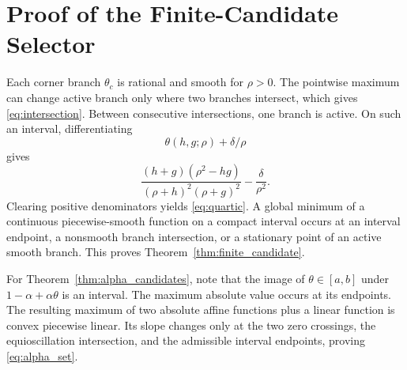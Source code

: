 \documentclass[11pt]{article}
\theoremstyle{definition}
\begin{document}
\section{Proof of the Finite-Candidate Selector}\label{app:candidates}
Each corner branch $\theta_c$ is rational and smooth for $\rho>0$. The pointwise maximum can change active branch only where two branches intersect, which gives \eqref{eq:intersection}. Between consecutive intersections, one branch is active. On such an interval, differentiating
\[
\theta(h,g;\rho)+\delta/\rho
\]
gives
\[
\frac{(h+g)(\rho^2-hg)}{(\rho+h)^2(\rho+g)^2}-\frac{\delta}{\rho^2}.
\]
Clearing positive denominators yields \eqref{eq:quartic}. A global minimum of a continuous piecewise-smooth function on a compact interval occurs at an interval endpoint, a nonsmooth branch intersection, or a stationary point of an active smooth branch. This proves Theorem~\ref{thm:finite_candidate}.

For Theorem~\ref{thm:alpha_candidates}, note that the image of $\theta\in[a,b]$ under $1-\alpha+\alpha\theta$ is an interval. The maximum absolute value occurs at its endpoints. The resulting maximum of two absolute affine functions plus a linear function is convex piecewise linear. Its slope changes only at the two zero crossings, the equioscillation intersection, and the admissible interval endpoints, proving \eqref{eq:alpha_set}.
\end{document}

